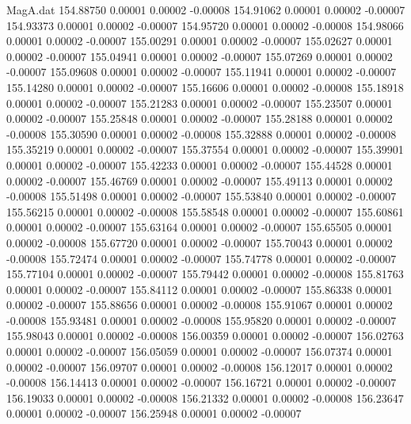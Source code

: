 \begin{filecontents}{MagA.dat}
 154.88750    0.00001    0.00002   -0.00008
 154.91062    0.00001    0.00002   -0.00007
 154.93373    0.00001    0.00002   -0.00007
 154.95720    0.00001    0.00002   -0.00008
 154.98066    0.00001    0.00002   -0.00007
 155.00291    0.00001    0.00002   -0.00007
 155.02627    0.00001    0.00002   -0.00007
 155.04941    0.00001    0.00002   -0.00007
 155.07269    0.00001    0.00002   -0.00007
 155.09608    0.00001    0.00002   -0.00007
 155.11941    0.00001    0.00002   -0.00007
 155.14280    0.00001    0.00002   -0.00007
 155.16606    0.00001    0.00002   -0.00008
 155.18918    0.00001    0.00002   -0.00007
 155.21283    0.00001    0.00002   -0.00007
 155.23507    0.00001    0.00002   -0.00007
 155.25848    0.00001    0.00002   -0.00007
 155.28188    0.00001    0.00002   -0.00008
 155.30590    0.00001    0.00002   -0.00008
 155.32888    0.00001    0.00002   -0.00008
 155.35219    0.00001    0.00002   -0.00007
 155.37554    0.00001    0.00002   -0.00007
 155.39901    0.00001    0.00002   -0.00007
 155.42233    0.00001    0.00002   -0.00007
 155.44528    0.00001    0.00002   -0.00007
 155.46769    0.00001    0.00002   -0.00007
 155.49113    0.00001    0.00002   -0.00008
 155.51498    0.00001    0.00002   -0.00007
 155.53840    0.00001    0.00002   -0.00007
 155.56215    0.00001    0.00002   -0.00008
 155.58548    0.00001    0.00002   -0.00007
 155.60861    0.00001    0.00002   -0.00007
 155.63164    0.00001    0.00002   -0.00007
 155.65505    0.00001    0.00002   -0.00008
 155.67720    0.00001    0.00002   -0.00007
 155.70043    0.00001    0.00002   -0.00008
 155.72474    0.00001    0.00002   -0.00007
 155.74778    0.00001    0.00002   -0.00007
 155.77104    0.00001    0.00002   -0.00007
 155.79442    0.00001    0.00002   -0.00008
 155.81763    0.00001    0.00002   -0.00007
 155.84112    0.00001    0.00002   -0.00007
 155.86338    0.00001    0.00002   -0.00007
 155.88656    0.00001    0.00002   -0.00008
 155.91067    0.00001    0.00002   -0.00008
 155.93481    0.00001    0.00002   -0.00008
 155.95820    0.00001    0.00002   -0.00007
 155.98043    0.00001    0.00002   -0.00008
 156.00359    0.00001    0.00002   -0.00007
 156.02763    0.00001    0.00002   -0.00007
 156.05059    0.00001    0.00002   -0.00007
 156.07374    0.00001    0.00002   -0.00007
 156.09707    0.00001    0.00002   -0.00008
 156.12017    0.00001    0.00002   -0.00008
 156.14413    0.00001    0.00002   -0.00007
 156.16721    0.00001    0.00002   -0.00007
 156.19033    0.00001    0.00002   -0.00008
 156.21332    0.00001    0.00002   -0.00008
 156.23647    0.00001    0.00002   -0.00007
 156.25948    0.00001    0.00002   -0.00007

\end{filecontents}
